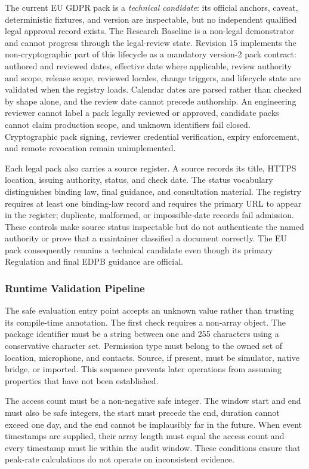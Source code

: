 The current EU GDPR pack is a \emph{technical candidate}: its official anchors, caveat, deterministic fixtures, and version are inspectable, but no independent qualified legal approval record exists. The Research Baseline is a non-legal demonstrator and cannot progress through the legal-review state. Revision 15 implements the non-cryptographic part of this lifecycle as a mandatory version-2 pack contract: authored and reviewed dates, effective date where applicable, review authority and scope, release scope, reviewed locales, change triggers, and lifecycle state are validated when the registry loads. Calendar dates are parsed rather than checked by shape alone, and the review date cannot precede authorship. An engineering reviewer cannot label a pack legally reviewed or approved, candidate packs cannot claim production scope, and unknown identifiers fail closed. Cryptographic pack signing, reviewer credential verification, expiry enforcement, and remote revocation remain unimplemented.

Each legal pack also carries a source register. A source records its title, HTTPS location, issuing authority, status, and check date. The status vocabulary distinguishes binding law, final guidance, and consultation material. The registry requires at least one binding-law record and requires the primary URL to appear in the register; duplicate, malformed, or impossible-date records fail admission. These controls make source status inspectable but do not authenticate the named authority or prove that a maintainer classified a document correctly. The EU pack consequently remains a technical candidate even though its primary Regulation and final EDPB guidance are official.

\subsubsection{Runtime Validation Pipeline}

The safe evaluation entry point accepts an unknown value rather than trusting its compile-time annotation. The first check requires a non-array object. The package identifier must be a string between one and 255 characters using a conservative character set. Permission type must belong to the owned set of location, microphone, and contacts. Source, if present, must be simulator, native bridge, or imported. This sequence prevents later operations from assuming properties that have not been established.

The access count must be a non-negative safe integer. The window start and end must also be safe integers, the start must precede the end, duration cannot exceed one day, and the end cannot be implausibly far in the future. When event timestamps are supplied, their array length must equal the access count and every timestamp must lie within the audit window. These conditions ensure that peak-rate calculations do not operate on inconsistent evidence.


